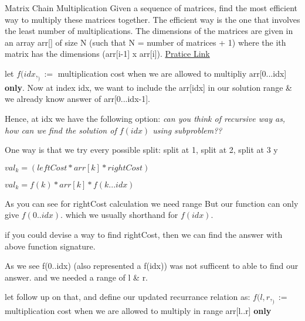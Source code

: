 \begin{problem}{Matrix Chain Multiplication}
    Given a sequence of matrices, find the most efficient way to multiply these matrices together. The efficient way is the one that involves the least number of multiplications.
    The dimensions of the matrices are given in an array arr[] of size N (such that N = number of matrices + 1) where the ith matrix has the dimensions (arr[i-1] x arr[i]).
    \href{https://practice.geeksforgeeks.org/problems/matrix-chain-multiplication0303/1}{Pratice Link}
\end{problem}

\begin{solution}
    let $f(idx,_):= $ multiplication cost when we are allowed to multipliy arr[0...idx] \textbf{only}.
    Now at index idx, we want to include the arr[idx] in our solution range \& we already know answer of arr[0...idx-1].

    Hence, at idx we have the following option:
    \textit{can you think of recursive way as, how can we find the solution of $f(idx)$ using subproblem??}

    One way is that we try every possible split: 
    split at 1, split at 2, split at 3 
    y

    $ val_k =( leftCost * arr[k] * rightCost )$

    
    $ val_k = f(k)*arr[k]* f(k...idx) $
    
    As you can see for rightCost calculation we need range 
    But our function can only give $f(0..idx)$.  which we usually shorthand for $f(idx)$.

    if you could devise a way to find rightCost, then we can find the answer with above function signature.


\end{solution}

\begin{solution}
    As we see f(0..idx) (also represented a f(idx)) was not sufficent to able to find our answer.
    and we needed a range of l \& r.

    let follow up on that, and define our updated recurrance relation as:
    $f(l,r,_):=$ multiplication cost when we are allowed to multiply in range arr[l..r] \textbf{only}
\end{solution}

